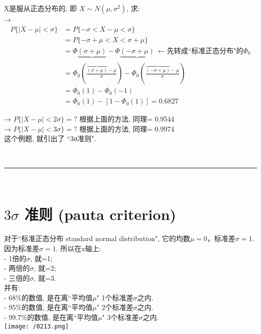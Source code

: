 \documentclass[UTF8]{ctexart}
\begin{document}
\begin{myEnvSample}
X是服从正态分布的, 即 $X\sim N\left( \mu ,\sigma ^2 \right) $, 求: \\
→ 
\begin{align*}  %
	P\{|X-\mu |<\sigma \}
&=P\{-\sigma <X-\mu <\sigma \}\\
&=P\{-\sigma +\mu <X<\sigma +\mu \}\\
&=\varPhi \underset{}{\underbrace{\left( \sigma +\mu \right) }}-\varPhi \underset{}{\underbrace{\left( -\sigma +\mu \right) }}\ \gets \text{先转成``标准正态分布"的}\varPhi _0\\
&=\varPhi _0\left( \frac{\overset{}{\overbrace{(\sigma +\mu )}}-\mu}{\sigma} \right) -\varPhi _0\left( \frac{\overset{}{\overbrace{(-\sigma +\mu )}}-\mu}{\sigma} \right)\\
&=\varPhi _0(1)-\varPhi _0(-1)\\
&=\varPhi _0(1)-\left[ 1-\varPhi _0(1) \right] =0.6827 
\end{align*}

→ $P\{|X-\mu |<2\sigma \} = ?$ 根据上面的方法, 同理= 0.9544 \\
→ $P\{|X-\mu |<3\sigma \} = ?$ 根据上面的方法, 同理= 0.9974 \\

这个例题, 就引出了 ``3σ准则".
\end{myEnvSample}



~\\
\hrule
~\\



\section{$3\sigma$ 准则 (pauta criterion)}

对于``标准正态分布 standard normal distribution", 它的均数$\mu=0$，标准差$\sigma =1$. \\
因为标准差$\sigma =1$. 所以在x轴上: \\
- 1倍的$\sigma$, 就=1;  \\
- 两倍的$\sigma$, 就=2; \\
- 三倍的$\sigma$, 就=3. \\

并有: \\
- 68\%的数值, 是在离``平均值$\mu$" 1个标准差$\sigma$之内. \\
- 95\%的数值, 是在离``平均值$\mu$" 2个标准差$\sigma$之内. \\
- 99.7\%的数值, 是在离``平均值$\mu$" 3个标准差$\sigma$之内. \\
\texttt{[image: /0213.png]} \\
\end{document}
